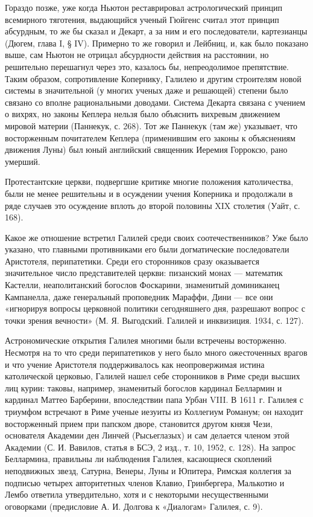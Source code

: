 Гораздо позже, уже когда Ньютон реставрировал астрологический принцип
всемирного тяготения, выдающийся ученый Гюйгенс считал этот принцип абсурдным,
то же бы сказал и Декарт, а за ним и его последователи, картезианцы (Дюгем,
глава I, § IV). Примерно то же говорил и Лейбниц, и, как было показано выше,
сам Ньютон не отрицал абсурдности действия на расстоянии, но решительно
перешагнул через это, казалось бы, непреодолимое препятствие. Таким образом,
сопротивление Копернику, Галилею и другим строителям новой системы в
значительной (у многих ученых даже и решающей) степени было связано со вполне
рациональными доводами. Система Декарта связана с учением о вихрях, но законы
Кеплера нельзя было объяснить вихревым движением мировой материи (Паннекук, с.
268). Тот же Паннекук (там же) указывает, что восторженным почитателем Кеплера
(применившим его законы к объяснениям движения Луны) был юный английский
священник Иеремия Горроксю, рано умерший.

Протестантские церкви, подвергшие критике многие положения католичества, были
не менее решительны и в осуждении учения Коперника и продолжали в ряде случаев
это осуждение вплоть до второй половины XIX столетия (Уайт, с. 168).

Какое же отношение встретил Галилей среди своих соотечественников? Уже было
указано, что главными противниками его были догматические последователи
Аристотеля, перипатетики. Среди его сторонников сразу оказывается значительное
число представителей церкви: пизанский монах --- математик Кастелли,
неаполитанский богослов Фоскарини, знаменитый доминиканец Кампанелла, даже
генеральный проповедник Мараффи, Дини --- все они «игнорируя вопросы церковной
политики сегодняшнего дня, разрешают вопрос с точки зрения вечности» (М. Я.
Выгодский. Галилей и инквизиция. 1934, с. 127).

Астрономические открытия Галилея многими были встречены восторженно. Несмотря
на то что среди перипатетиков у него было много ожесточенных врагов и что
учение Аристотеля поддерживалось как неопровержимая истина католической
церковью, Галилей нашел себе сторонников в Риме среди высших лиц курии: таковы,
например, знаменитый богослов кардинал Беллармин и кардинал Маттео Барберини,
впоследствии папа Урбан VIII. В 1611 г. Галилея с триумфом встречают в Риме
ученые иезуиты из Коллегиум Романум; он находит восторженный прием при папском
дворе, становится другом князя Чези, основателя Академии ден Линчей
(Рысьеглазых) и сам делается членом этой Академии (С. И. Вавилов, статья в БСЭ,
2 изд., т. 10, 1952, с. 128). На запрос Беллармина, правильны ли наблюдения
Галилея, касающиеся скоплений неподвижных звезд, Сатурна, Венеры, Луны и
Юпитера, Римская коллегия за подписью четырех авторитетных членов Клавио,
Гринбергера, Малькотио и Лембо ответила утвердительно, хотя и с некоторыми
несущественными оговорками (предисловие А. И. Долгова к «Диалогам» Галилея, с.
9).

